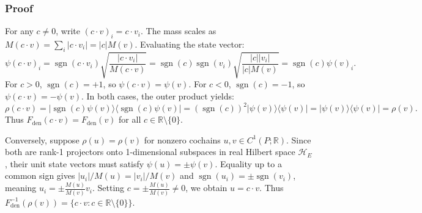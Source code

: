 \documentclass[
  10pt,
]{article}
\begin{document}
\subsubsection{Proof}\label{proof-1}

For any \protect\hypertarget{math-E0071-0087}{}{\(c \ne 0\)}, write \protect\hypertarget{math-E0072-0088}{}{\((c \cdot v)_i = c \cdot v_i\)}. The mass scales as \protect\hypertarget{math-E0073-0089}{}{\(M(c \cdot v) = \sum_i |c \cdot v_i| = |c| M(v)\)}. Evaluating the state vector: \protect\hypertarget{math-E0074-0090}{}{\[\psi(c \cdot v)_i = \operatorname{sgn}(c \cdot v_i) \sqrt{\frac{|c \cdot v_i|}{M(c \cdot v)}} = \operatorname{sgn}(c) \operatorname{sgn}(v_i) \sqrt{\frac{|c| |v_i|}{|c| M(v)}} = \operatorname{sgn}(c) \psi(v)_i.\]} For \protect\hypertarget{math-E0075-0091}{}{\(c > 0\)}, \protect\hypertarget{math-E0076-0092}{}{\(\operatorname{sgn}(c) = +1\)}, so \protect\hypertarget{math-E0077-0093}{}{\(\psi(c \cdot v) = \psi(v)\)}. For \protect\hypertarget{math-E0078-0094}{}{\(c < 0\)}, \protect\hypertarget{math-E0079-0095}{}{\(\operatorname{sgn}(c) = -1\)}, so \protect\hypertarget{math-E0080-0096}{}{\(\psi(c \cdot v) = -\psi(v)\)}. In both cases, the outer product yields: \protect\hypertarget{math-E0081-0097}{}{\[\rho(c \cdot v) = |\operatorname{sgn}(c) \psi(v)\rangle \langle \operatorname{sgn}(c) \psi(v)| = (\operatorname{sgn}(c))^2 |\psi(v)\rangle \langle \psi(v)| = |\psi(v)\rangle \langle \psi(v)| = \rho(v).\]} Thus \protect\hypertarget{math-E0082-0098}{}{\(F_{\mathrm{den}}(c \cdot v) = F_{\mathrm{den}}(v)\)} for all \protect\hypertarget{math-E0063-0099}{}{\(c \in \mathbb{R} \setminus \{0\}\)}.

Conversely, suppose \protect\hypertarget{math-E0083-0100}{}{\(\rho(u) = \rho(v)\)} for nonzero cochains \protect\hypertarget{math-E0084-0101}{}{\(u, v \in C^1(P; \mathbb{R})\)}. Since both are rank-1 projectors onto 1-dimensional subspaces in real Hilbert space \protect\hypertarget{math-E0085-0102}{}{\(\mathcal{H}_E\)}, their unit state vectors must satisfy \protect\hypertarget{math-E0086-0103}{}{\(\psi(u) = \pm \psi(v)\)}. Equality up to a common sign gives \protect\hypertarget{math-E0087-0104}{}{\(|u_i| / M(u) = |v_i| / M(v)\)} and \protect\hypertarget{math-E0088-0105}{}{\(\operatorname{sgn}(u_i) = \pm \operatorname{sgn}(v_i)\)}, meaning \protect\hypertarget{math-E0089-0106}{}{\(u_i = \pm \frac{M(u)}{M(v)} v_i\)}. Setting \protect\hypertarget{math-E0090-0107}{}{\(c = \pm \frac{M(u)}{M(v)} \ne 0\)}, we obtain \protect\hypertarget{math-E0091-0108}{}{\(u = c \cdot v\)}. Thus \protect\hypertarget{math-E0005-0109}{}{\(F_{\mathrm{den}}^{-1}(\rho(v)) = \{c \cdot v : c \in \mathbb{R} \setminus \{0\}\}\)}.
\end{document}
